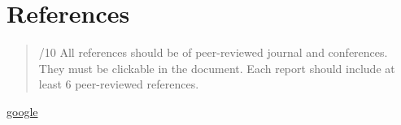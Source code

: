 \documentclass[conference]{IEEEtran}
\begin{document}
\hypertarget{references}{%
\section{References}\label{references}}

\begin{quote}
/10 All references should be of peer-reviewed journal and conferences.
They must be clickable in the document. Each report should include at
least 6 peer-reviewed references.
\end{quote}

\href{http://google.com}{google}

% 

\printbibliography
\end{document}
